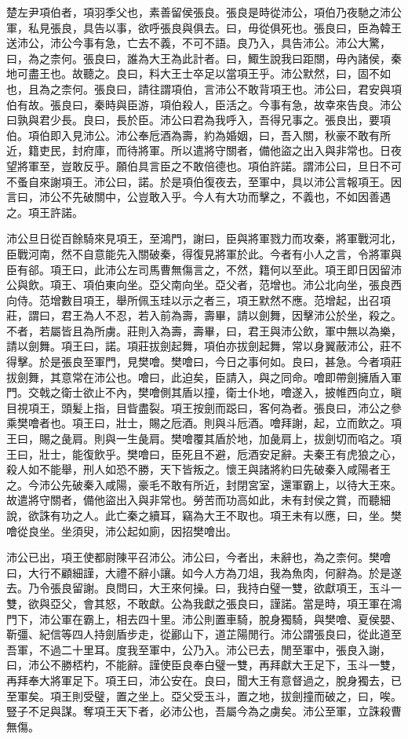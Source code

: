楚左尹項伯者，項羽季父也，素善留侯張良。張良是時從沛公，項伯乃夜馳之沛公軍，私見張良，具告以事，欲呼張良與俱去。曰，毋從俱死也。張良曰，臣為韓王送沛公，沛公今事有急，亡去不義，不可不語。良乃入，具告沛公。沛公大驚，曰，為之柰何。張良曰，誰為大王為此計者。曰，鯫生說我曰距關，毋內諸侯，秦地可盡王也。故聽之。良曰，料大王士卒足以當項王乎。沛公默然，曰，固不如也，且為之柰何。張良曰，請往謂項伯，言沛公不敢背項王也。沛公曰，君安與項伯有故。張良曰，秦時與臣游，項伯殺人，臣活之。今事有急，故幸來告良。沛公曰孰與君少長。良曰，長於臣。沛公曰君為我呼入，吾得兄事之。張良出，要項伯。項伯即入見沛公。沛公奉卮酒為壽，約為婚姻，曰，吾入關，秋豪不敢有所近，籍吏民，封府庫，而待將軍。所以遣將守關者，備他盜之出入與非常也。日夜望將軍至，豈敢反乎。願伯具言臣之不敢倍德也。項伯許諾。謂沛公曰，旦日不可不蚤自來謝項王。沛公曰，諾。於是項伯復夜去，至軍中，具以沛公言報項王。因言曰，沛公不先破關中，公豈敢入乎。今人有大功而擊之，不義也，不如因善遇之。項王許諾。

沛公旦日從百餘騎來見項王，至鴻門，謝曰，臣與將軍戮力而攻秦，將軍戰河北，臣戰河南，然不自意能先入關破秦，得復見將軍於此。今者有小人之言，令將軍與臣有郤。項王曰，此沛公左司馬曹無傷言之，不然，籍何以至此。項王即日因留沛公與飲。項王、項伯東向坐。亞父南向坐。亞父者，范增也。沛公北向坐，張良西向侍。范增數目項王，舉所佩玉珪以示之者三，項王默然不應。范增起，出召項莊，謂曰，君王為人不忍，若入前為壽，壽畢，請以劍舞，因擊沛公於坐，殺之。不者，若屬皆且為所虜。莊則入為壽，壽畢，曰，君王與沛公飲，軍中無以為樂，請以劍舞。項王曰，諾。項莊拔劍起舞，項伯亦拔劍起舞，常以身翼蔽沛公，莊不得擊。於是張良至軍門，見樊噲。樊噲曰，今日之事何如。良曰，甚急。今者項莊拔劍舞，其意常在沛公也。噲曰，此迫矣，臣請入，與之同命。噲即帶劍擁盾入軍門。交戟之衛士欲止不內，樊噲側其盾以撞，衛士仆地，噲遂入，披帷西向立，瞋目視項王，頭髪上指，目眥盡裂。項王按劍而跽曰，客何為者。張良曰，沛公之參乘樊噲者也。項王曰，壯士，賜之卮酒。則與斗卮酒。噲拜謝，起，立而飲之。項王曰，賜之彘肩。則與一生彘肩。樊噲覆其盾於地，加彘肩上，拔劍切而啗之。項王曰，壯士，能復飲乎。樊噲曰，臣死且不避，卮酒安足辭。夫秦王有虎狼之心，殺人如不能舉，刑人如恐不勝，天下皆叛之。懷王與諸將約曰先破秦入咸陽者王之。今沛公先破秦入咸陽，豪毛不敢有所近，封閉宮室，還軍霸上，以待大王來。故遣將守關者，備他盜出入與非常也。勞苦而功高如此，未有封侯之賞，而聽細說，欲誅有功之人。此亡秦之續耳，竊為大王不取也。項王未有以應，曰，坐。樊噲從良坐。坐須臾，沛公起如廁，因招樊噲出。

沛公已出，項王使都尉陳平召沛公。沛公曰，今者出，未辭也，為之柰何。樊噲曰，大行不顧細謹，大禮不辭小讓。如今人方為刀俎，我為魚肉，何辭為。於是遂去。乃令張良留謝。良問曰，大王來何操。曰，我持白璧一雙，欲獻項王，玉斗一雙，欲與亞父，會其怒，不敢獻。公為我獻之張良曰，謹諾。當是時，項王軍在鴻門下，沛公軍在霸上，相去四十里。沛公則置車騎，脫身獨騎，與樊噲、夏侯嬰、靳彊、紀信等四人持劍盾步走，從酈山下，道芷陽閒行。沛公謂張良曰，從此道至吾軍，不過二十里耳。度我至軍中，公乃入。沛公已去，閒至軍中，張良入謝，曰，沛公不勝桮杓，不能辭。謹使臣良奉白璧一雙，再拜獻大王足下，玉斗一雙，再拜奉大將軍足下。項王曰，沛公安在。良曰，聞大王有意督過之，脫身獨去，已至軍矣。項王則受璧，置之坐上。亞父受玉斗，置之地，拔劍撞而破之，曰，唉。豎子不足與謀。奪項王天下者，必沛公也，吾屬今為之虜矣。沛公至軍，立誅殺曹無傷。

